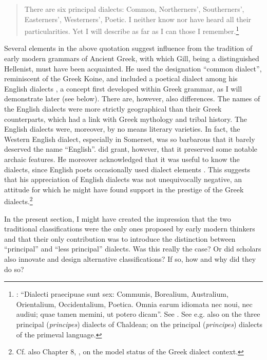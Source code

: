 \begin{quote}
There are six principal dialects: Common, Northerners’, Southerners’, Easterners’, Westerners’, Poetic. I neither know nor have heard all their particularities. Yet I will describe as far as I can those I remember.\footnote{\citet[15]{Gill1619}: “Dialecti praecipuae sunt sex: Communis, Borealium, Australium, Orientalium, Occidentalium, Poetica. Omnia earum idiomata nec noui, nec audiui; quae tamen memini, ut potero dicam”. See \citet{Kokeritz1938}. See e.g. also \citet[liv]{Thomassin1697} on the three principal (\textit{principes}) dialects of Chaldean; \citet[\textsc{xciii}]{Schultens1748} on the principal (\textit{principes}) dialects of the primeval language.}
\end{quote}

Several elements in the above quotation suggest influence from the tradition of early modern grammars of Ancient Greek, with which Gill, being a distinguished Hellenist, must have been acquainted. He used the designation “common dialect”, reminiscent of the Greek Koine, and included a poetical dialect among his English dialects \citep[18]{Gill1619}, a concept first developed within Greek grammar, as I will demonstrate later (see  below). There are, however, also differences. The names of the English dialects were more strictly geographical than their Greek counterparts, which had a link with Greek mythology and tribal history. The English dialects were, moreover, by no means literary varieties. In fact, the Western English dialect, especially in Somerset, was so barbarous that it barely deserved the name “English”. \citet[17]{Gill1619} did grant, however, that it preserved some notable archaic features. He moreover acknowledged that it was useful to know the dialects, since English poets occasionally used dialect elements \citep[18]{Gill1619}. This suggests that his appreciation of English dialects was not unequivocally negative, an attitude for which he might have found support in the prestige of the Greek dialects.\footnote{Cf. also Chapter 8, , on the model status of the Greek dialect context.}

In the present section, I might have created the impression that the two traditional classifications were the only ones proposed by early modern thinkers and that their only contribution was to introduce the distinction between “principal” and “less principal” dialects. Was this really the case? Or did scholars also innovate and design alternative classifications? If so, how and why did they do so?

